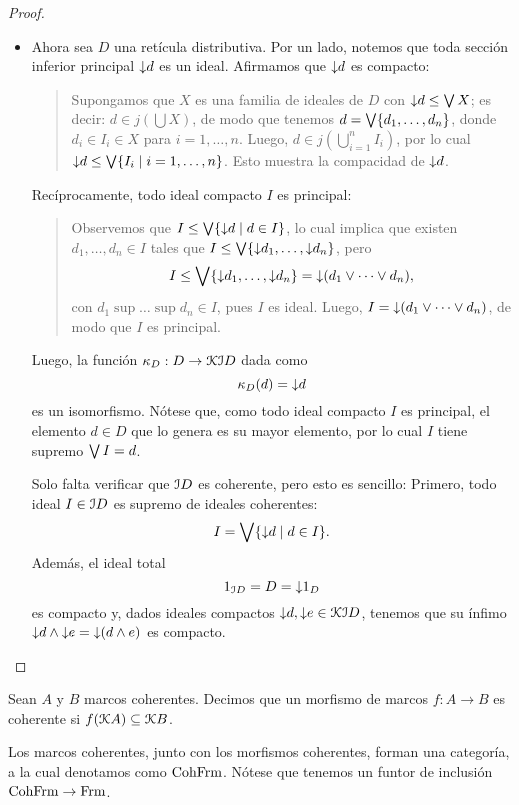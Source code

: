\begin{proof}
\begin{itemize}
        \item
        Ahora sea $D$ una retícula distributiva.
        Por un lado, notemos que toda sección inferior
        principal $\down d$ es un ideal.
        Afirmamos que $\down d$ es compacto:
        \begin{quote}
            Supongamos que $X$ es una familia de ideales de $D$
            con $\down d\leq \Sup X$; es decir: $d\in j(\bigcup X)$,
            de modo que tenemos $d=\Sup\{d_1,\dots,d_n\}$,
            donde $d_i\in I_i\in X$ para $i=1,\dots,n$.
            Luego, $d\in j(\bigcup_{i=1}^n I_i)$,
            por lo cual $\down d\leq\Sup\{I_i\mid i=1,\dots,n\}$.
            Esto muestra la compacidad de $\down d$.
        \end{quote}
        Recíprocamente, todo ideal compacto $I$ es principal:
        \begin{quote}
            Observemos que $I\leq\Sup\{\down d\mid d\in I\}$,
            lo cual implica que existen $d_1,\dots,d_n\in I$
            tales que $I\leq\Sup\{\down d_1,\dots,\down d_n\}$,
            pero
            \[
                I
                \leq \Sup\{\down d_1,\dots,\down d_n\}
                = \down(d_1\sup\cdots\sup d_n),
            \]
            con $d_1\sup\dots\sup d_n\in I$, pues $I$ es ideal.
            Luego, $I=\down(d_1\sup\cdots\sup d_n)$,
            de modo que $I$ es principal.
       \end{quote} 
        Luego, la función $\kappa_D:D\to\cal K\cal ID$ dada como
        \[
            \kappa_D(d) = \down d
        \]
        es un isomorfismo.
        Nótese que, como todo ideal compacto $I$ es principal,
        el elemento $d\in D$ que lo genera es su mayor elemento,
        por lo cual $I$ tiene supremo $\Sup I=d$.
        
        Solo falta verificar que $\cal ID$ es coherente,
        pero esto es sencillo:
        Primero, todo ideal $I\in\cal ID$ es supremo
        de ideales coherentes:
        \[
            I = \Sup\{\down d\mid d\in I\}.
        \]
        Además, el ideal total
        \[
            1_{\cal ID}=D=\down 1_D
        \]
        es compacto y, dados ideales compactos
        $\down d,\down e\in\cal K\cal ID$, tenemos que su ínfimo
        $\down d\inf\down e=\down(d\inf e)$ es compacto.
    \end{itemize}
\end{proof}

\begin{definition}
    Sean $A$ y $B$ marcos coherentes.
    Decimos que un morfismo de marcos $f:A\to B$ es coherente
    si $f(\cal KA)\subseteq\cal KB$.
    
    Los marcos coherentes, junto con los morfismos coherentes,
    forman una categoría, a la cual denotamos como $\CohFrm$.
    Nótese que tenemos un funtor de inclusión $\CohFrm\to\Frm$.
\end{definition}

